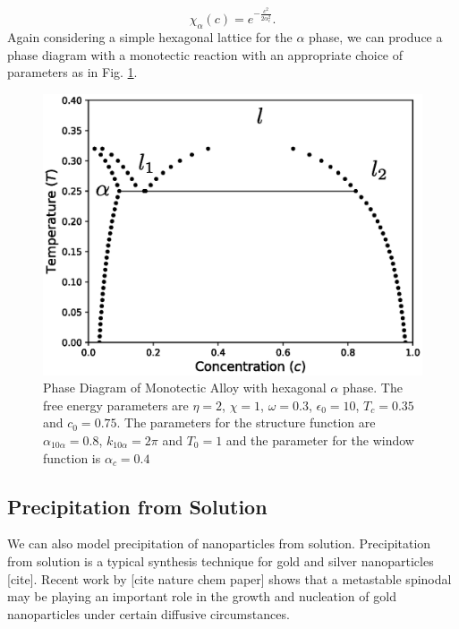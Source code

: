 \documentclass[showkeys, prb, reprint]{revtex4-1}
\newcommand{\f}{\frac}
\begin{document}
\begin{equation}
    \chi_\alpha(c) = e^{-\f{c^2}{2\alpha_c^2}}.
\end{equation}
Again considering a simple hexagonal lattice for the $\alpha$ phase, we can produce a phase diagram with a monotectic reaction with an appropriate choice of parameters as in Fig. \ref{monotectic}. 
\begin{figure}
	\includegraphics[scale=0.5]{monotectic.eps}
	\caption{\label{monotectic} Phase Diagram of Monotectic Alloy with hexagonal $\alpha$ phase. The free energy parameters are $\eta = 2$, $\chi=1$, $\omega=0.3$, $\epsilon_0 = 10$, $T_c = 0.35$ and $c_0 = 0.75$. The parameters for the structure function are $\alpha_{10\alpha} = 0.8$, $k_{10\alpha} = 2\pi$ and $T_0 = 1$ and the parameter for the window function is $\alpha_c = 0.4$}
\end{figure}

\subsection{Precipitation from Solution}

We can also model precipitation of nanoparticles from solution. Precipitation from solution is a typical synthesis technique for gold and silver nanoparticles [cite]. Recent work by [cite nature chem paper] shows that a metastable spinodal may be playing an important role in the growth and nucleation of gold nanoparticles under certain diffusive circumstances.
\end{document}
